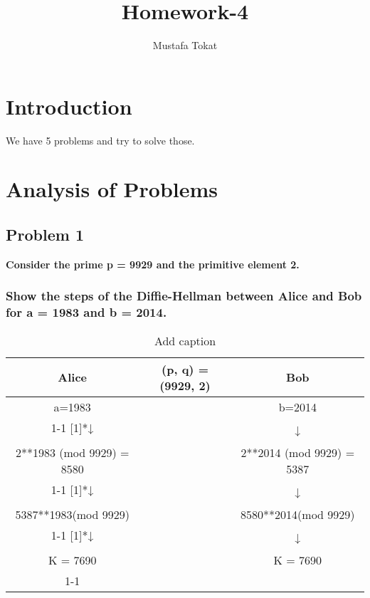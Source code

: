 \documentclass[11pt]{article}
\begin{document}
\title{Homework-4}
\author{Mustafa Tokat}
\maketitle
\section{Introduction}

We have 5 problems and try to solve those.\\

\section{Analysis of Problems}
\subsection{Problem 1} \textbf{Consider the prime p = 9929 and the primitive element 2.}
\subsubsection{\textbf{Show the steps of the Diffie-Hellman between Alice and Bob for a = 1983 and b = 2014.}}
\begin{table}[htbp]
    \centering
    \caption{Add caption}
      \begin{tabular}{ccc}
      \toprule
      Alice & (p, q) = (9929, 2) & Bob \\
      \midrule
      a=1983 &       & b=2014 \\
  \cmidrule{1-1}\cmidrule{3-3}    \multirow{2}[1]{*}{↓} &       & \multirow{2}[1]{*}{↓} \\
            &       &  \\
      \multicolumn{1}{c}{\multirow{2}[1]{*}{2**1983 (mod 9929)                                       = 8580}} &       & \multicolumn{1}{c}{\multirow{2}[1]{*}{2**2014 (mod 9929)              = 5387}} \\
            &       &  \\
  \cmidrule{1-1}\cmidrule{3-3}    \multirow{2}[1]{*}{↓} &       & \multirow{2}[1]{*}{↓} \\
            &       &  \\
      5387**1983(mod 9929) &       & 8580**2014(mod 9929) \\
  \cmidrule{1-1}\cmidrule{3-3}    \multirow{2}[1]{*}{↓} &       & \multirow{2}[1]{*}{↓} \\
            &       &  \\
      K = 7690 &       & K = 7690 \\
  \cmidrule{1-1}\cmidrule{3-3}    \end{tabular}%
    \label{tab:addlabel}%
  \end{table}%
  
\end{document}
